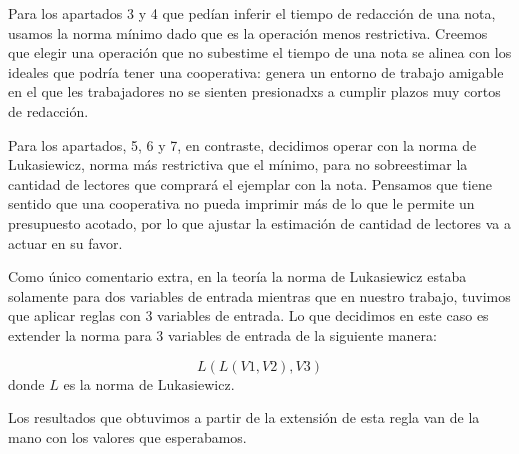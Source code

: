 \documentclass{article}
\begin{document}
Para los apartados 3 y 4 que pedían inferir el tiempo de redacción de una nota, usamos la norma mínimo dado que es la operación menos restrictiva. Creemos que elegir una operación que no subestime el tiempo de una nota se alinea con los ideales que podría tener una cooperativa: genera un entorno de trabajo amigable en el que les trabajadores no se sienten presionadxs a cumplir plazos muy cortos de redacción.

Para los apartados, 5, 6 y 7, en contraste, decidimos operar con la norma de Lukasiewicz, norma más restrictiva que el mínimo, para no sobreestimar la cantidad de lectores que comprará el ejemplar con la nota. Pensamos que tiene sentido que una cooperativa no pueda imprimir más de lo que le permite un presupuesto acotado, por lo que ajustar la estimación de cantidad de lectores va a actuar en su favor.

Como único comentario extra, en la teoría la norma de Lukasiewicz estaba solamente para dos variables de entrada mientras que en nuestro trabajo, tuvimos que aplicar reglas con 3 variables de entrada. Lo que decidimos en este caso es extender la norma para 3 variables de entrada de la siguiente manera:

$$L(L(V1,V2),V3)$$ donde $L$ es la norma de Lukasiewicz.

Los resultados que obtuvimos a partir de la extensión de esta regla van de la mano con los valores que esperabamos.
\end{document}
